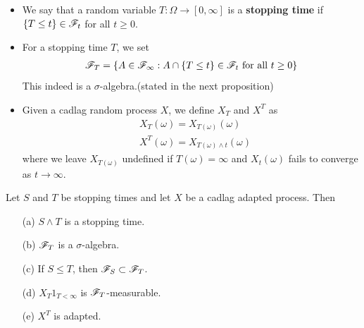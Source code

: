 \documentclass[10pt,a4paper]{report}
\begin{document}
\begin{itemize}
\item We say that a random variable $T : \Omega \rightarrow [0,\infty]$ is a \textbf{stopping time} if $\{T\leq t\} \in \mathscr{F}_t$ for all $t\geq 0$. 
\item For a stopping time $T$, we set
\begin{align*}
\mathscr{F}_T = \{A\in \mathscr{F}_{\infty} : A \cap \{T\leq t \} \in \mathscr{F}_t \text{ for all } t\geq 0 \}
\end{align*}
This indeed is a $\sigma$-algebra.(stated in the next proposition)
\item Given a cadlag random process $X$, we define $X_T$ and $X^T$ as
\begin{align*}
& X_T(\omega) = X_{T(\omega)} (\omega) \\
& X^T(\omega) = X_{T(\omega)\wedge t}(\omega)
\end{align*}
where we leave $X_{T(\omega)}$ undefined if $T(\omega) = \infty$ and $X_{t}(\omega)$ fails to converge as $t\rightarrow \infty$.
\end{itemize}
\s

 Let $S$ and $T$ be stopping times and let $X$ be a cadlag adapted process. Then
\begin{itemize}
\item[(a)] $S\wedge T$ is a stopping time.
\item[(b)] $\mathscr{F}_T$ is a $\sigma$-algebra.
\item[(c)] If $S\leq T$, then $\mathscr{F}_S \subset \mathscr{F}_T$.
\item[(d)] $X_T 1_{T<\infty}$ is $\mathscr{F}_T$-measurable.
\item[(e)] $X^T$ is adapted.
\end{itemize}
\s
\end{document}
